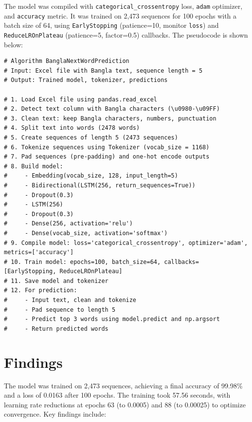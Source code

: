 \documentclass[12pt]{article}
\begin{document}
The model was compiled with \texttt{categorical\_crossentropy} loss, \texttt{adam} optimizer, and \texttt{accuracy} metric. It was trained on 2,473 sequences for 100 epochs with a batch size of 64, using \texttt{EarlyStopping} (patience=10, monitor \texttt{loss}) and \texttt{ReduceLROnPlateau} (patience=5, factor=0.5) callbacks. The pseudocode is shown below:

\begin{lstlisting}
# Algorithm BanglaNextWordPrediction
# Input: Excel file with Bangla text, sequence length = 5
# Output: Trained model, tokenizer, predictions

# 1. Load Excel file using pandas.read_excel
# 2. Detect text column with Bangla characters (\u0980-\u09FF)
# 3. Clean text: keep Bangla characters, numbers, punctuation
# 4. Split text into words (2478 words)
# 5. Create sequences of length 5 (2473 sequences)
# 6. Tokenize sequences using Tokenizer (vocab_size = 1168)
# 7. Pad sequences (pre-padding) and one-hot encode outputs
# 8. Build model:
#     - Embedding(vocab_size, 128, input_length=5)
#     - Bidirectional(LSTM(256, return_sequences=True))
#     - Dropout(0.3)
#     - LSTM(256)
#     - Dropout(0.3)
#     - Dense(256, activation='relu')
#     - Dense(vocab_size, activation='softmax')
# 9. Compile model: loss='categorical_crossentropy', optimizer='adam', metrics=['accuracy']
# 10. Train model: epochs=100, batch_size=64, callbacks=[EarlyStopping, ReduceLROnPlateau]
# 11. Save model and tokenizer
# 12. For prediction:
#     - Input text, clean and tokenize
#     - Pad sequence to length 5
#     - Predict top 3 words using model.predict and np.argsort
#     - Return predicted words
\end{lstlisting}

\section{Findings}
The model was trained on 2,473 sequences, achieving a final accuracy of 99.98\% and a loss of 0.0163 after 100 epochs. The training took 57.56 seconds, with learning rate reductions at epochs 63 (to 0.0005) and 88 (to 0.00025) to optimize convergence. Key findings include:
\end{document}
